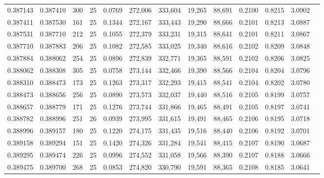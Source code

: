\begin{tabular}{rrrrrrrrrrrrr}
0.387143 & 0.387410 &   300 &  25 &                                     0.0769 & 272,006 & 333,604 &  19,265 &  88,691 & 0.2100 & 0.8215 & 3.0902 \\
0.387411 & 0.387530 &   161 &  25 &                                     0.1344 & 272,167 & 333,443 &  19,290 &  88,666 & 0.2101 & 0.8213 & 3.0887 \\
0.387531 & 0.387710 &   212 &  25 &                                     0.1055 & 272,379 & 333,231 &  19,315 &  88,641 & 0.2101 & 0.8211 & 3.0867 \\
0.387710 & 0.387883 &   206 &  25 &                                     0.1082 & 272,585 & 333,025 &  19,340 &  88,616 & 0.2102 & 0.8209 & 3.0848 \\
0.387884 & 0.388062 &   254 &  25 &                                     0.0896 & 272,839 & 332,771 &  19,365 &  88,591 & 0.2102 & 0.8206 & 3.0825 \\
0.388062 & 0.388308 &   305 &  25 &                                     0.0758 & 273,144 & 332,466 &  19,390 &  88,566 & 0.2104 & 0.8204 & 3.0796 \\
0.388310 & 0.388473 &   173 &  25 &                                     0.1263 & 273,317 & 332,293 &  19,415 &  88,541 & 0.2104 & 0.8202 & 3.0780 \\
0.388473 & 0.388656 &   256 &  25 &                                     0.0890 & 273,573 & 332,037 &  19,440 &  88,516 & 0.2105 & 0.8199 & 3.0757 \\
0.388657 & 0.388779 &   171 &  25 &                                     0.1276 & 273,744 & 331,866 &  19,465 &  88,491 & 0.2105 & 0.8197 & 3.0741 \\
0.388782 & 0.388996 &   251 &  26 &                                     0.0939 & 273,995 & 331,615 &  19,491 &  88,465 & 0.2106 & 0.8195 & 3.0718 \\
0.388996 & 0.389157 &   180 &  25 &                                     0.1220 & 274,175 & 331,435 &  19,516 &  88,440 & 0.2106 & 0.8192 & 3.0701 \\
0.389158 & 0.389294 &   151 &  25 &                                     0.1420 & 274,326 & 331,284 &  19,541 &  88,415 & 0.2107 & 0.8190 & 3.0687 \\
0.389295 & 0.389474 &   226 &  25 &                                     0.0996 & 274,552 & 331,058 &  19,566 &  88,390 & 0.2107 & 0.8188 & 3.0666 \\
0.389475 & 0.389700 &   268 &  25 &                                     0.0853 & 274,820 & 330,790 &  19,591 &  88,365 & 0.2108 & 0.8185 & 3.0641 \\

\end{tabular}

